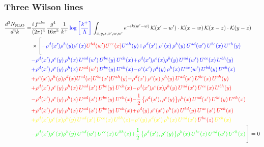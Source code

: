\documentclass[9pt]{article}
\numberwithin{equation}{section}
\begin{document}
\subsubsection{Three Wilson lines}
\begin{align}
\frac{d^{3}N_{\rm NLO}}{d^{3}k}= &\frac{i\,f^{abc}}{(2\pi)^{3}}\,\frac{g^{4}}{16\pi^{5}}\,\frac{1}{k^{+}}\,{\color{blue}\log{\left[\frac{k^{+}}{\Lambda}\right]}}\,\int_{x,y,z,x',w,w'}e^{-ik(w'-w)}\,\mathcal{K}(x'-w')\cdot\mathcal{K}(x-w)\,\mathcal{K}(x-z)\cdot\mathcal{K}(y-z)\notag\\
&\times\Bigg[{\color{blue}-\rho^{d}(x') \rho^{h}(y) \rho^{e}(x) {\color{red}U^{bd}(w')} {\color{red}U^{ce}(x)} U^{a h}(y)} {\color{blue}+\rho^{d}(x')\,\rho^{e}(x)\,\rho^{h}(y)\,U^{ad}(w')\,U^{be}(x)\,U^{ch}(y)} \notag \\ &{\color{blue}-\rho^{d}(x')\,\rho^{e}(y)\,\rho^{h}(x)\,U^{ad}(w')\,U^{be}(y)\,U^{ch}(x)}{\color{blue}+\rho^{d}(x')\rho^{e}(x)\rho^{h}(y)\, U^{ad}(w')\,U^{ce}(x)\, U^{bh}(y)}\notag \\ &{\color{blue}+\rho^{d}(x')\, \rho^{e}(y)\,\rho^{h}(x)\, {\color{red}U^{ad}(w')}\,U^{be}(y)\,U^{ch}(x)}{\color{blue}-\rho^{e}(x')\,\rho^{d}(y)\,\rho^{h}(x)\,U^{ae}(w')\,U^{bd}(y)\,U^{ch}(x)}\notag \\ &{\color{red}+\rho^{e}(x') \rho^{h}(y) \rho^{d}(x) {\color{red}U^{cd}(x)} U^{b e}(x') U^{a h}(y)}{\color{red}-\rho^{d}(x')\,\rho^{e}(x)\,\rho^{h}(y)\,U^{ad}(x')\,U^{be}(x)\,U^{ch}(y)}\notag \\ &{\color{red}+\rho^{d}(x')\,\rho^{e}(y)\,\rho^{h}(x)\,U^{ad}(x')\,U^{be}(y)\,U^{ch}(x)}{\color{red}-\rho^{d}(x')\rho^{e}(x)\rho^{h}(y)\, U^{ad}(x')\,U^{ce}(x)\, U^{bh}(y)}\notag \\ &{\color{red}-\rho^{d}(x')\, \rho^{e}(y)\,\rho^{h}(x)\, {\color{red}U^{ad}(x')}\,U^{be}(y)\,U^{ch}(x)}{\color{red}-\frac{1}{2}\,\big\{\rho^{d}(x'),\rho^{e}(y)\big\}\rho^{h}(x)\,U^{ad}(x')\,U^{be}(y)\,U^{ch}(x)}\notag \\ & {\color{red}+\rho^{d}(x')\,\rho^{e}(y)\,\rho^{h}(x)\,U^{ad}(x')\,U^{be}(y)\,U^{ch}(x)}{\color{red}+\rho^{d}(y)\,\rho^{e}(x')\,\rho^{h}(x)\,U^{bd}(y)\,U^{ae}(x')\,U^{ch}(x)}\notag \\ & {\color{yellow}+\rho^{d}(x')\rho^{e}(x)\rho^{h}(y)\, U^{ad}(x')\,U^{ce}(x)\, U^{bh}(z)}{\color{yellow}-\rho^{e}(y)\,\rho^{d}(x')\,\rho^{h}(x)\,U^{ad}(x')\,{\color{red}U^{be}(z)}\,U^{ch}(x)}\notag \\
&{\color{green}-\rho^{d}(x')\rho^{e}(x)\rho^{h}(y)\, U^{ad}(w')\,U^{ce}(x)\, U^{bh}(z)}{\color{green}+\frac{1}{2}\,\big\{\rho^{d}(x'),\rho^{e}(y)\big\}\rho^{h}(x)\,U ^{be}(z)\,U^{ad}(w')\,U^{ch}(x)}\,\Bigg] = 0 
\end{align}
\end{document}
